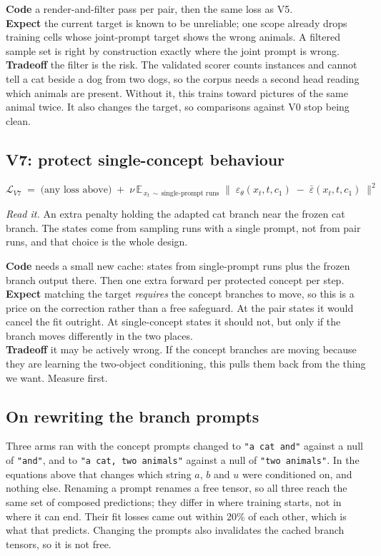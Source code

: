 \documentclass[11pt]{article}
\newcommand{\eps}{\varepsilon}
\newcommand{\B}[1]{\textbf{#1}}
\newcommand{\LL}{\mathcal{L}}
\newcommand{\sq}[1]{\Big\lVert #1 \Big\rVert^2}
\newcommand{\readit}[1]{\par\smallskip\noindent\textit{Read it.} #1}
\begin{document}
\noindent\B{Code} \quad a render-and-filter pass per pair, then the same loss as V5.\\
\B{Expect} \quad the current target is known to be unreliable; one scope already drops training
cells whose joint-prompt target shows the wrong animals. A filtered sample set is right by
construction exactly where the joint prompt is wrong.\\
\B{Tradeoff} \quad the filter is the risk. The validated scorer counts instances and cannot tell a
cat beside a dog from two dogs, so the corpus needs a second head reading which animals are present.
Without it, this trains toward pictures of the same animal twice. It also changes the target, so
comparisons against V0 stop being clean.

\subsection*{V7: protect single-concept behaviour}
\begin{equation}
  \LL_{V7} \;=\; \big(\text{any loss above}\big)
  \;+\; \nu\,\mathbb{E}_{\,x_t \,\sim\, \text{single-prompt runs}}\;
  \sq{\;\eps_\theta(x_t,t,c_1) \;-\; \bar\eps(x_t,t,c_1)\;}
\end{equation}
\readit{An extra penalty holding the adapted cat branch near the frozen cat branch. The states come
from sampling runs with a single prompt, not from pair runs, and that choice is the whole design.}

\noindent\B{Code} \quad needs a small new cache: states from single-prompt runs plus the frozen
branch output there. Then one extra forward per protected concept per step.\\
\B{Expect} \quad matching the target \emph{requires} the concept branches to move, so this is a
price on the correction rather than a free safeguard. At the pair states it would cancel the fit
outright. At single-concept states it should not, but only if the branch moves differently in the
two places.\\
\B{Tradeoff} \quad it may be actively wrong. If the concept branches are moving because they are
learning the two-object conditioning, this pulls them back from the thing we want. Measure first.

\subsection*{On rewriting the branch prompts}
Three arms ran with the concept prompts changed to \texttt{"a cat and"} against a null of
\texttt{"and"}, and to \texttt{"a cat, two animals"} against a null of \texttt{"two animals"}. In
the equations above that changes which string $a$, $b$ and $u$ were conditioned on, and nothing
else. Renaming a prompt renames a free tensor, so all three reach the same set of composed
predictions; they differ in where training starts, not in where it can end. Their fit losses came
out within 20\% of each other, which is what that predicts. Changing the prompts also invalidates
the cached branch tensors, so it is not free.
\end{document}
